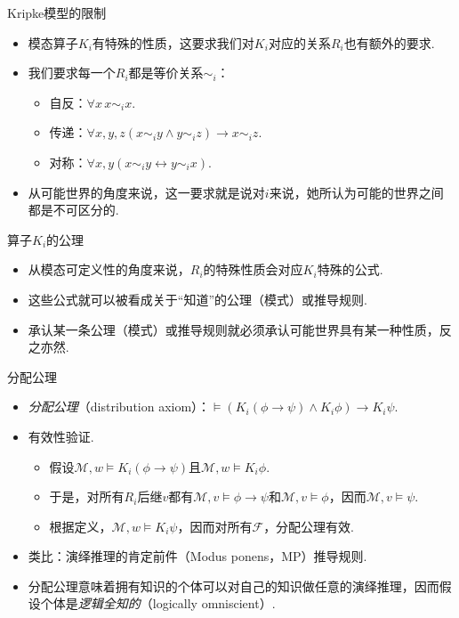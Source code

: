 \begin{frame}{Kripke模型的限制}
\begin{itemize}
    \item 模态算子$K_i$有特殊的性质，这要求我们对$K_i$对应的关系$R_i$也有额外的要求.
    \item 我们要求每一个$R_i$都是等价关系$\sim_i$：
    \begin{itemize}
        \item 自反：$\forall x\, x\sim_ix$.
        \item 传递：$\forall x,y,z(x\sim_iy\wedge y\sim_iz)\to x\sim_iz$.
        \item 对称：$\forall x,y(x \sim_i y\leftrightarrow y\sim_ix)$.
    \end{itemize}
    \item 从可能世界的角度来说，这一要求就是说对$i$来说，她所认为可能的世界之间都是不可区分的.
\end{itemize}
\end{frame}
\begin{frame}{算子$K_i$的公理}
\begin{itemize}
    \item 从模态可定义性的角度来说，$R_i$的特殊性质会对应$K_i$特殊的公式.
    \item 这些公式就可以被看成关于“知道”的公理（模式）或推导规则.
    \item 承认某一条公理（模式）或推导规则就必须承认可能世界具有某一种性质，反之亦然.
\end{itemize}
\end{frame}
\begin{frame}{分配公理}
\begin{itemize}
    \item \emph{分配公理}（distribution axiom）：$\vDash (K_i(\phi\to\psi)\wedge K_i\phi)\to K_i\psi$.
    \item 有效性验证.
    \begin{itemize}
        \item 假设$\mathcal M,w\vDash K_i(\phi\to\psi)$且$\mathcal M,w\vDash K_i \phi$.
        \item 于是，对所有$R_i$后继$v$都有$\mathcal M,v\vDash\phi\to\psi$和$\mathcal M,v\vDash\phi$，因而$\mathcal M,v\vDash\psi$.
        \item 根据定义，$\mathcal M,w\vDash K_i\psi$，因而对所有$\mathcal F$，分配公理有效.
    \end{itemize}
    \item 类比：演绎推理的肯定前件（Modus ponens，MP）推导规则.
    \item 分配公理意味着拥有知识的个体可以对自己的知识做任意的演绎推理，因而假设个体是\emph{逻辑全知的}（logically omniscient）.
\end{itemize}
\end{frame}
